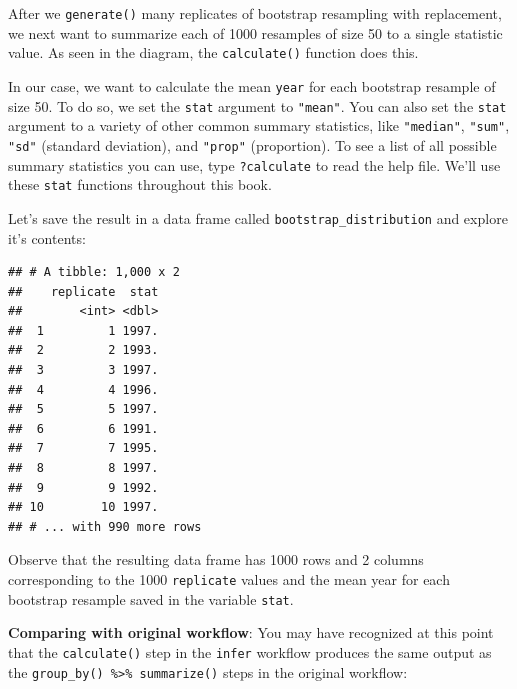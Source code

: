 \documentclass[
]{book}
\newenvironment{Shaded}{\begin{snugshade}}{\end{snugshade}}
\newcommand{\DataTypeTok}[1]{\textcolor[rgb]{0.13,0.29,0.53}{#1}}
\newcommand{\DecValTok}[1]{\textcolor[rgb]{0.00,0.00,0.81}{#1}}
\newcommand{\KeywordTok}[1]{\textcolor[rgb]{0.13,0.29,0.53}{\textbf{#1}}}
\newcommand{\NormalTok}[1]{#1}
\newcommand{\OperatorTok}[1]{\textcolor[rgb]{0.81,0.36,0.00}{\textbf{#1}}}
\newcommand{\StringTok}[1]{\textcolor[rgb]{0.31,0.60,0.02}{#1}}
\begin{document}
After we \texttt{generate()} many replicates of bootstrap resampling with replacement, we next want to summarize each of 1000 resamples of size 50 to a single statistic value. As seen in the diagram, the \texttt{calculate()}  function does this.

In our case, we want to calculate the mean \texttt{year} for each bootstrap resample of size 50. To do so, we set the \texttt{stat} argument to \texttt{"mean"}. You can also set the \texttt{stat} argument to a variety of other common summary statistics, like \texttt{"median"}, \texttt{"sum"}, \texttt{"sd"} (standard deviation), and \texttt{"prop"} (proportion). To see a list of all possible summary statistics you can use, type \texttt{?calculate} to read the help file. We'll use these \texttt{stat} functions throughout this book.

Let's save the result in a data frame called \texttt{bootstrap\_distribution} and explore it's contents:

\begin{Shaded}
\end{Shaded}

\begin{verbatim}
## # A tibble: 1,000 x 2
##    replicate  stat
##        <int> <dbl>
##  1         1 1997.
##  2         2 1993.
##  3         3 1997.
##  4         4 1996.
##  5         5 1997.
##  6         6 1991.
##  7         7 1995.
##  8         8 1997.
##  9         9 1992.
## 10        10 1997.
## # ... with 990 more rows
\end{verbatim}

Observe that the resulting data frame has 1000 rows and 2 columns corresponding to the 1000 \texttt{replicate} values and the mean year for each bootstrap resample saved in the variable \texttt{stat}.

\textbf{Comparing with original workflow}: You may have recognized at this point that the \texttt{calculate()} step in the \texttt{infer} workflow produces the same output as the \texttt{group\_by()\ \%\textgreater{}\%\ summarize()} steps in the original workflow:
\end{document}
